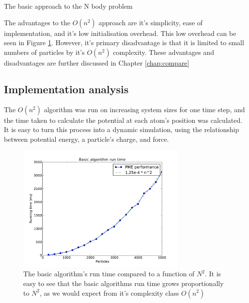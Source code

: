 \documentclass[pdftex,twoside,a4paper]{report}
\newcommand{\bcen}{\begin{center}}
\newcommand{\ecen}{\end{center}}
\begin{document}
\begin{algorithm}
 \SetLine
 \caption{The basic approach to the N body problem}
 \label{alg:basic}
\end{algorithm}

The advantages to the $O(n^2)$ approach are it's simplicity, ease of implementation, and it's low initialisation overhead. This low overhead can be seen in Figure \ref{fig:basic_algo_complex}. However, it's primary disadvantage is that it is limited to small numbers of particles by it's $O(n^2)$ complexity. These advantages and disadvantages are further discussed in Chapter \ref{chap:compare}

\subsection{Implementation analysis}
The $O(n^2)$ algorithm was run on increasing system sizes for one time step, and the time taken to calculate the potential at each atom's position was calculated. It is easy to turn this process into a dynamic simulation, using the relationship between potential energy, a particle's charge, and force.
\begin{figure}
\bcen \includegraphics[width=0.75\textwidth]{figures/graphs/basic_algo_complex.pdf} \ecen
\caption{The basic algorithm's run time compared to a function of $N^2$. It is easy to see that the basic algorithms run time grows proportionally to $N^2$, as we would expect from it's complexity class $O(n^2)$}
\label{fig:basic_algo_complex}
\end{figure}
\end{document}
